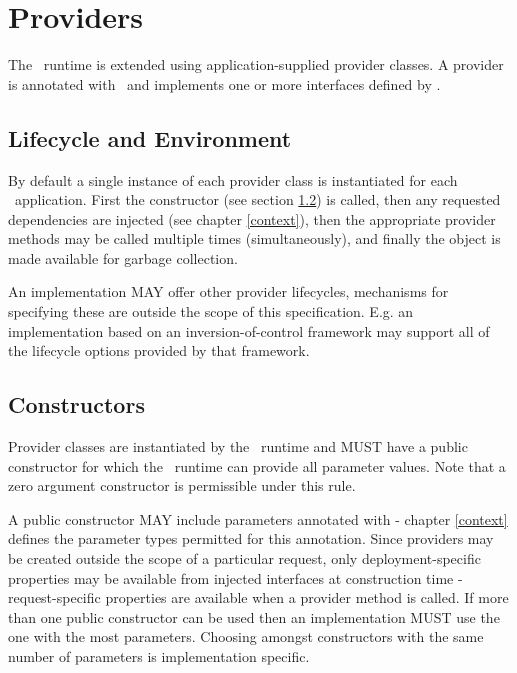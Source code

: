 \chapter{Providers}
\label{providers}

The \jaxrs\ runtime is extended using application-supplied provider classes. A provider is annotated with \Provider\ and implements one or more interfaces defined by \jaxrs.

\section{Lifecycle and Environment}

By default a single instance of each provider class is instantiated for each \jaxrs\ application. First the constructor (see section \ref{provider_class_constructor}) is called, then any requested dependencies are injected (see chapter \ref{context}), then the appropriate provider methods may be called multiple times (simultaneously), and finally the object is made available for garbage collection.

An implementation MAY offer other provider lifecycles, mechanisms for specifying these are outside the scope of this specification. E.g. an implementation based on an inversion-of-control framework may support all of the lifecycle options provided by that framework.

\section{Constructors}
\label{provider_class_constructor}

Provider classes are instantiated by the \jaxrs\ runtime and MUST have a public constructor for which the \jaxrs\ runtime can provide all parameter values. Note that a zero argument constructor is permissible under this rule.

A public constructor MAY include parameters annotated with \Context - chapter \ref{context} defines the parameter types permitted for this annotation. Since providers may be created outside the scope of a particular request, only deployment-specific properties may be available from injected interfaces at construction time - request-specific properties are available when a provider method is called. If more than one public constructor can be used then an implementation MUST use the one with the most parameters. Choosing amongst constructors with the same number of parameters is implementation specific.

